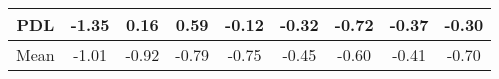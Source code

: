 \documentclass[11pt,a4paper]{report}
\begin{document}
\begin{centering}
\begin{longtable}{ | c || c | c | c | c | c | c | c || c |}
PDL &  \cellcolor[HTML]{FFDFDF} -1.35 &  \cellcolor[HTML]{F7F7FF} 0.16 &  \cellcolor[HTML]{EFEFFF} 0.59 &  \cellcolor[HTML]{FFFFFF} -0.12 &  \cellcolor[HTML]{FFF7F7} -0.32 &  \cellcolor[HTML]{FFEFEF} -0.72 &  \cellcolor[HTML]{FFF7F7} -0.37 &  \cellcolor[HTML]{FFF7F7} -0.30 \\
\hline
\hline
Mean  &  \cellcolor[HTML]{FFE7E7} -1.01 &  \cellcolor[HTML]{FFE7E7} -0.92 &  \cellcolor[HTML]{FFEFEF} -0.79 &  \cellcolor[HTML]{FFEFEF} -0.75 &  \cellcolor[HTML]{FFF7F7} -0.45 &  \cellcolor[HTML]{FFEFEF} -0.60 &  \cellcolor[HTML]{FFF7F7} -0.41 &  \cellcolor[HTML]{FFEFEF} -0.70 \\
\hline
\end{longtable}
\end{centering}
\end{document}
